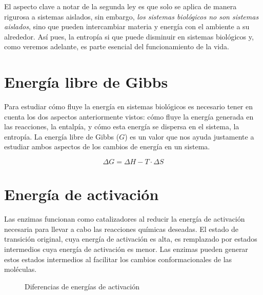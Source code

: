 El aspecto clave a notar de la segunda ley es que solo se aplica de manera rigurosa a sistemas aislados, sin embargo, \emph{los sistemas biológicos no son sistemas aislados}, sino que pueden intercambiar materia y energía con el ambiente a su alrededor. Así pues, la entropía si que puede disminuir en sistemas biológicos y, como veremos adelante, es parte esencial del funcionamiento de la vida.

\section{Energía libre de Gibbs}

Para estudiar cómo fluye la energía en sistemas biológicos es necesario tener en cuenta los dos aspectos anteriormente vistos: cómo fluye la energía generada en las reacciones, la entalpía, y cómo esta energía se dispersa en el sistema, la entropía. La energía libre de Gibbs ($G$) es un valor que nos ayuda justamente a estudiar ambos aspectos de los cambios de energía en un sistema.

\begin{equation}
    \Delta G = \Delta H - T \cdot \Delta S
\end{equation}

\marginpar{\begin{minipage}{\marginparwidth}
    
\end{minipage}}

\section{Energía de activación}

Las enzimas funcionan como catalizadores al reducir la energía de activación necesaria para llevar a cabo las reacciones químicas deseadas. El estado de transición original, cuya energía de activación es alta, es remplazado por estados intermedios cuya energía de activación es menor. Las enzimas pueden generar estos estados intermedios al facilitar los cambios conformacionales de las moléculas.

\begin{figure}\centering
    
    \caption{Diferencias de energías de activación}
    \label{fig:diferencia_de_energias_de_activacion}
\end{figure}


